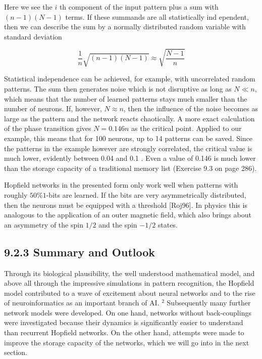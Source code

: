 \documentclass[10pt]{article}
\begin{document}
Here we see the $i$ th component of the input pattern plus a sum with $(n-1)(N-1)$ terms. If these summands are all statistically ind
ependent, then we can describe the sum by a normally distributed random variable with standard deviation

$$
\frac{1}{n} \sqrt{(n-1)(N-1)} \approx \sqrt{\frac{N-1}{n}}
$$

Statistical independence can be achieved, for example, with uncorrelated random patterns. The sum then generates noise which is not disruptive as long as $N \ll n$, which means that the number of learned patterns stays much smaller than the number of neurons. If, however, $N \approx n$, then the influence of the noise becomes as large as the pattern and the network reacts chaotically. A more exact calculation of the phase transition gives $N=0.146 n$ as the critical point. Applied to our example, this means that for 100 neurons, up to 14 patterns can be saved. Since the patterns in the example however are strongly correlated, the critical value is much lower, evidently between 0.04 and 0.1 . Even a value of 0.146 is much lower than the storage capacity of a traditional memory list (Exercise 9.3 on page 286).

Hopfield networks in the presented form only work well when patterns with roughly $50 \% 1$-bits are learned. If the bits are very asymmetrically distributed, then the neurons must be equipped with a threshold [Roj96]. In physics this is analogous to the application of an outer magnetic field, which also brings about an asymmetry of the spin $1 / 2$ and the spin $-1 / 2$ states.

\subsection*{9.2.3 Summary and Outlook}
Through its biological plausibility, the well understood mathematical model, and above all through the impressive simulations in pattern recognition, the Hopfield model contributed to a wave of excitement about neural networks and to the rise of neuroinformatics as an important branch of AI. ${ }^{2}$ Subsequently many further network models were developed. On one hand, networks without back-couplings were investigated because their dynamics is significantly easier to understand than recurrent Hopfield networks. On the other hand, attempts were made to improve the storage capacity of the networks, which we will go into in the next section.
\end{document}

